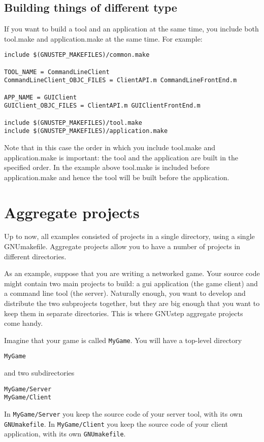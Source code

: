 \documentclass[a4paper]{article}
\begin{document}
\subsection{Building things of different type}
If you want to build a tool and an application at the same time, you
include both tool.make and application.make at the same time.  For
example:
\begin{verbatim}
include $(GNUSTEP_MAKEFILES)/common.make

TOOL_NAME = CommandLineClient
CommandLineClient_OBJC_FILES = ClientAPI.m CommandLineFrontEnd.m

APP_NAME = GUIClient
GUIClient_OBJC_FILES = ClientAPI.m GUIClientFrontEnd.m

include $(GNUSTEP_MAKEFILES)/tool.make
include $(GNUSTEP_MAKEFILES)/application.make
\end{verbatim}

Note that in this case the order in which you include tool.make and
application.make is important: the tool and the application are built
in the specified order.  In the example above tool.make is included
before application.make and hence the tool will be built before the
application.

\section{Aggregate projects}
Up to now, all examples consisted of projects in a single directory,
using a single GNUmakefile.  Aggregate projects allow you to have a
number of projects in different directories.

As an example, suppose that you are writing a networked game.  Your
source code might contain two main projects to build: a gui
application (the game client) and a command line tool (the server).
Naturally enough, you want to develop and distribute the two
subprojects together, but they are big enough that you want to keep
them in separate directories.  This is where GNUstep aggregate
projects come handy.

Imagine that your game is called \texttt{MyGame}.  You will have a
top-level directory
\begin{verbatim}
MyGame
\end{verbatim} 
and two subdirectories
\begin{verbatim}
MyGame/Server
MyGame/Client
\end{verbatim}
In \texttt{MyGame/Server} you keep the source code of your server
tool, with its own \texttt{GNUmakefile}.  In \texttt{MyGame/Client}
you keep the source code of your client application, with its own
\texttt{GNUmakefile}.
\end{document}
